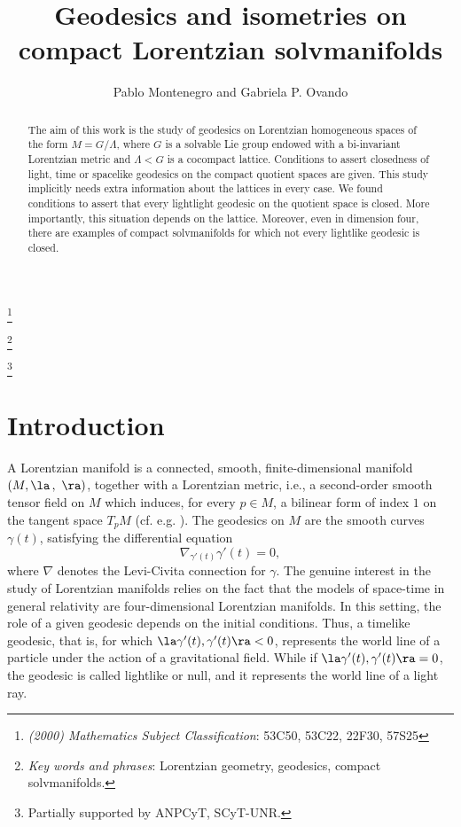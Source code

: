 \documentclass[12pt]{amsart}
\theoremstyle{plain}
\theoremstyle{definition}
\theoremstyle{remark}
\begin{document}
\title[Geodesics and isometries on compact Lorentzian solvmanifolds]{Geodesics and isometries on compact Lorentzian solvmanifolds}

\begin{abstract}
The aim of this work is the study of geodesics on Lorentzian homogeneous spaces of the form $M=G/\Lambda$, where $G$ is a solvable Lie group endowed with a bi-invariant Lorentzian metric and $\Lambda < G$ is a cocompact lattice. Conditions to assert closedness of light, time or spacelike geodesics on the compact quotient spaces are given. This study implicitly needs extra information about the lattices in every case. We found conditions to assert that every lightlight geodesic on the quotient space is closed. More importantly, this situation depends on the lattice. Moreover, even in dimension four, there are examples of compact solvmanifolds for which not every lightlike geodesic is closed.
\end{abstract}

\author{Pablo Montenegro and Gabriela P. Ovando}

\let\today\relax 
\thanks{{\it (2000) Mathematics Subject Classification}: 53C50, 53C22, 22F30, 57S25}

\thanks{{\it Key words and phrases}: Lorentzian geometry, geodesics, compact solvmanifolds.}

\thanks{Partially supported by ANPCyT, SCyT-UNR.}

\address{Departamento de Matemática, ECEN - FCEIA, Universidad Nacional de Rosario, Pellegrini 250, 2000 Rosario, Santa Fe, Argentina.}


\maketitle

\section{Introduction}
A Lorentzian manifold is a connected, smooth, finite-dimensional manifold $(M, \la \, , \ \ra)$, together with a Lorentzian metric, i.e., a second-order smooth tensor field on $M$ which induces, for every $p\in M$, a bilinear form of index $1$ on the tangent space $T_pM$ (cf. e.g. \cite{ON}). The geodesics on $M$ are the smooth curves $\gamma(t)$, satisfying the differential equation
\begin{equation*}
\nabla_{\gamma'(t)}\gamma'(t)=0,
\end{equation*}
where $\nabla$ denotes the Levi-Civita connection for $\gamma$. The genuine interest in the study of Lorentzian manifolds relies on the fact that the models of space-time in general relativity are four-dimensional Lorentzian manifolds. In this setting, the role of a given geodesic depends on the initial conditions. Thus, a timelike geodesic, that is, for which $\la \gamma'(t), \gamma'(t)\ra < 0$, represents the world line of a particle under the action of a gravitational field. While if $\la \gamma'(t), \gamma'(t)\ra = 0$, the geodesic is called lightlike or null, and it represents the world line of a light ray.
\end{document}

